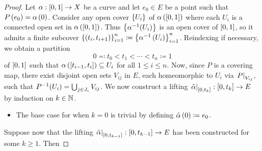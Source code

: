 \documentclass[../Moduli_Spaces_of_Riemann_Surfaces.tex]{subfiles}
\begin{document}
    \begin{proof}
        Let $\alpha:\left[0,1\right]\to X$ be a curve and let $e_0\in E$ be a point such that $P\left(e_0\right)=\alpha\left(0\right)$. Consider any open cover $\left\{U_i\right\}$ of $\alpha\left(\left[0,1\right]\right)$ where each $U_i$ is a connected open set in $\alpha\left(\left[0,1\right]\right)$. Thus $\left\{\alpha^{-1}\!\left(U_i\right)\right\}$ is an open cover of $\left[0,1\right]$, so it admits a finite subcover $\left\{\left(t_i,t_{i+1}\right)\right\}_{i=1}^n\coloneqq\left\{\alpha^{-1}\left(U_i\right)\right\}_{i=1}^n$. Reindexing if necessary, we obtain a partition
        \begin{equation*}
            0\eqqcolon t_0<t_1<\cdots<t_n\coloneqq1
        \end{equation*}
        of $\left[0,1\right]$ such that $\alpha\left(\left[t_{i-1},t_i\right]\right)\subseteq U_i$ for all $1\leq i\leq n$. Now, since $P$ is a covering map, there exist disjoint open sets $V_{ij}$ in $E$, each homeomorphic to $U_i$ via $\left.P\right|_{V_{ij}}$, such that $P^{-1}\!\left(U_i\right)=\bigcup_{j\in J_i}V_{ij}$. We now construct a lifting $\left.\tilde{\alpha}\right|_{\left[0,t_k\right]}:\left[0,t_k\right]\to E$ by induction on $k\in\mathbb{N}$.
        \begin{itemize}
            \item The base case for when $k=0$ is trivial by defining $\tilde{\alpha}\left(0\right)\coloneqq e_0$.
        \end{itemize}
        Suppose now that the lifting $\left.\tilde{\alpha}\right|_{\left[0,t_{k-1}\right]}:\left[0,t_{k-1}\right]\to E$ has been constructed for some $k\geq1$. Then
\end{proof}
\end{document}
